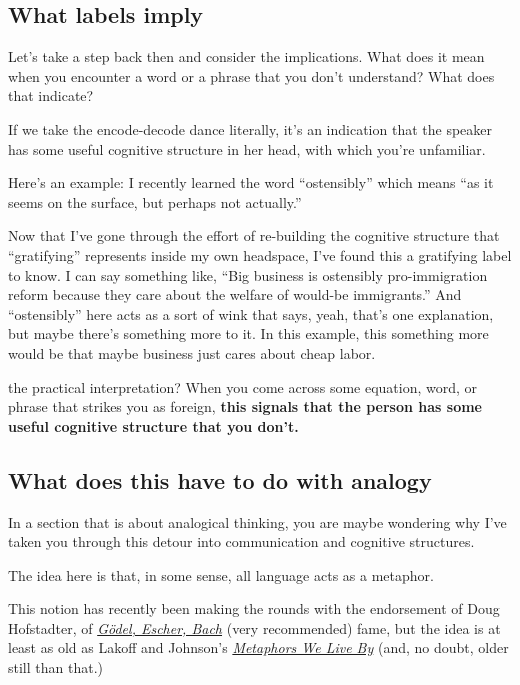 \subsection{What labels imply}\label{what-labels-imply}

Let's take a step back then and consider the implications. What
does it mean when you encounter a word or a phrase that you don't
understand? What does that indicate?

If we take the encode-decode dance literally, it's an indication that
the speaker has some useful cognitive structure in her head, with which
you're unfamiliar.

Here's an example: I recently learned the word
``ostensibly'' which means ``as it seems on the surface, but perhaps not
actually.''

Now that I've gone through the effort of re-building the cognitive structure that
``gratifying'' represents inside my own headspace, I've found this a gratifying label to know. I can say something like, ``Big business is ostensibly
pro-immigration reform because they care about the welfare of would-be
immigrants.'' And ``ostensibly'' here acts as a sort of wink that says,
yeah, that's one explanation, but maybe there's something more to it. In
this example, this something more would be that maybe business just
cares about cheap labor.

 the practical interpretation?
When you come across some equation, word, or phrase that
strikes you as foreign, \textbf{this signals that the person has some
useful cognitive structure that you don't.}

\subsection{What does this have to do with
analogy}\label{what-does-this-have-to-do-with-analogy}

In a section that is about analogical thinking, you are maybe
wondering why I've taken you through this detour into communication and
cognitive structures.

The idea here is that, in some sense, all language acts as a metaphor.

This notion has recently been making the rounds with the endorsement of
Doug Hofstadter, of
\href{http://www.amazon.com/gp/product/0465026567/ref=as_li_tl?ie=UTF8\&camp=1789\&creative=390957\&creativeASIN=0465026567\&linkCode=as2\&tag=rsio-20}{\emph{Gödel,
Escher, Bach}} (very recommended) fame, but the idea is at least as old
as Lakoff and Johnson's
\href{http://www.amazon.com/gp/product/0226468011/ref=as_li_tl?ie=UTF8\&camp=1789\&creative=390957\&creativeASIN=0226468011\&linkCode=as2\&tag=rsio-20}{\emph{Metaphors
We Live By}} (and, no doubt, older still than that.)

